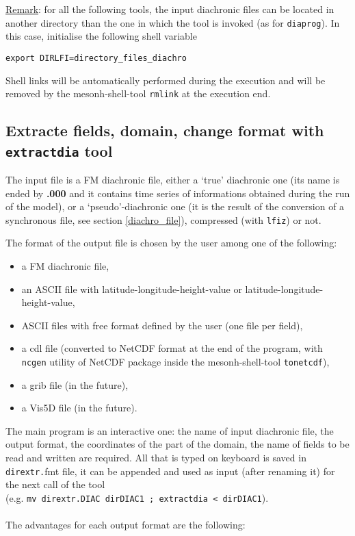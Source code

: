 \underline{Remark}:
 for all the following tools, the input diachronic files can be located
in another directory than the one in which the tool is invoked (as
for \texttt{diaprog}). In this case, initialise the following shell variable
\begin{verbatim}
export DIRLFI=directory_files_diachro
\end{verbatim}

Shell links will be automatically performed during the execution and
will be removed by the mesonh-shell-tool \texttt{rmlink} at the execution end.


\subsection{Extracte fields, domain, change format with
{\tt extractdia} tool}\label{extractdia}

The input file is a FM diachronic file, either a `true' diachronic one 
(its name is ended by {\bf .000} and it contains time series of informations 
obtained during the run of the model),
or a `pseudo'-diachronic one (it is the result of the conversion of a 
synchronous file, see section \ref{diachro_file}), compressed (with {\tt lfiz})
or not.

The format of the output file is chosen by the user among one of the following:
\begin{itemize}
\item a FM {\sc diac}hronic file, 
\item an ASCII file with 
{\sc l}atitude-{\sc l}ongitude-{\sc h}eight-{\sc v}alue or
latitude-longitude-height-value,
\item ASCII files with {\sc free} format defined by the user (one file per field),
\item a {\sc cdl} file (converted to NetCDF format at the end of the program,
with \texttt{ncgen} utility of NetCDF package inside the mesonh-shell-tool \texttt{tonetcdf}),
\item a {\sc grib} file (in the future),
\item a {\sc Vis5D} file (in the future).
\end{itemize}
The main program is an interactive one: 
the name of input diachronic file, the output format, 
the coordinates of the part of the domain,
the name of fields to be read and written are required.
All that is typed on keyboard is saved in {\tt dirextr.}fmt
file, it can be appended and used as input (after renaming it) for the next call
of the tool \\
(e.g. {\tt mv dirextr.DIAC dirDIAC1 ; extractdia < dirDIAC1}).
\\
\\
The advantages for each output format are the following:

